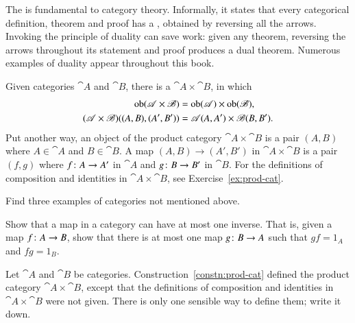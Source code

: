 \begin{remark}  
\label{rmk:principle-duality}
The %
%
%
is fundamental to category theory.  Informally, it states that every
categorical definition, theorem and proof has a , obtained by
reversing all the arrows.  Invoking the principle of duality can save work:
given any theorem, reversing the arrows throughout its statement and proof
produces a dual theorem.  Numerous examples of duality appear throughout
this book.
\end{remark}

\begin{constn}  
\label{constn:prod-cat}
Given categories $\cat{A}$ and $\cat{B}$, there is a  $\cat{A} \times \cat{B}$,%
%
%
 in which
% 
\begin{align*}
\operatorname{ob}(\mathscr{A} \times \mathscr{B})     &
=      
\operatorname{ob}(\mathscr{A}) \times \operatorname{ob}(\mathscr{B}),\\
(\mathscr{A} \times \mathscr{B})((A, B), (A', B'))      &
=      
\mathscr{A}(A, A') \times \mathscr{B}(B, B').
\end{align*}
% 
Put another way, an object of the product category $\cat{A} \times \cat{B}$
is a pair $(A, B)$ where $A \in \cat{A}$ and $B \in \cat{B}$.  A map $(A,
B) \to (A', B')$ in $\cat{A} \times \cat{B}$ is a pair $(f, g)$ where
$f\from A \to A'$ in $\cat{A}$ and $g\from B \to B'$ in $\cat{B}$.  For the
definitions of composition and identities in $\cat{A} \times \cat{B}$, see
Exercise~\ref{ex:prod-cat}.
\end{constn}


\exs


\begin{question}
Find three examples of categories not mentioned above.
\end{question}


\begin{question}        
\label{ex:unique-inverse}
Show that a map in a category can have at most one inverse.  That is, given
a map $f\from A \to B$, show that there is at most one map $g\from B \to A$
such that $gf = 1_A$ and $fg = 1_B$.  
\end{question}


\begin{question}        
\label{ex:prod-cat}
Let $\cat{A}$ and $\cat{B}$ be categories.
Construction~\ref{constn:prod-cat} defined the product category $\cat{A}
\times \cat{B}$, except that the definitions of composition and identities
in $\cat{A} \times \cat{B}$ were not given.  There is only one sensible way
to define them; write it down.
\end{question}


